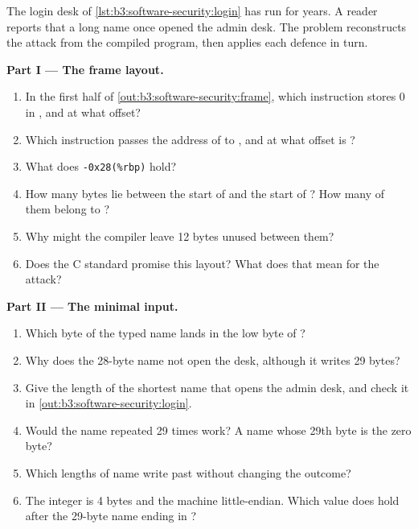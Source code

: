 \begin{problem}\label{pb:b3:software-security:1}
The login desk of \cref{lst:b3:software-security:login} has run for years. A reader reports that a long name once opened the admin desk. The problem reconstructs the attack from the compiled program, then applies each defence in turn.

\medskip\noindent\textbf{Part I --- The frame layout.}
\begin{enumerate}
  \item In the first half of \cref{out:b3:software-security:frame}, which instruction stores 0 in , and at what offset?
  \item Which instruction passes the address of  to , and at what offset is ?
  \item What does \texttt{-0x28(\%rbp)} hold?
  \item How many bytes lie between the start of  and the start of ? How many of them belong to ?
  \item Why might the compiler leave 12 bytes unused between them?
  \item Does the C standard promise this layout? What does that mean for the attack?
\end{enumerate}

\medskip\noindent\textbf{Part II --- The minimal input.}
\begin{enumerate}[resume]
  \item Which byte of the typed name lands in the low byte of ?
  \item Why does the 28-byte name not open the desk, although it writes 29 bytes?
  \item Give the length of the shortest name that opens the admin desk, and check it in \cref{out:b3:software-security:login}.
  \item Would the name  repeated 29 times work? A name whose 29th byte is the zero byte?
  \item Which lengths of name write past  without changing the outcome?
  \item The integer is 4 bytes and the machine little-endian. Which value does  hold after the 29-byte name ending in ?
\end{enumerate}


\end{problem}
